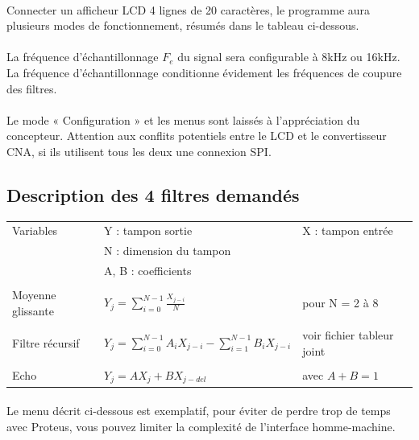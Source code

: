 \documentclass{article}
\begin{document}
    \paragraph{}
    Connecter un afficheur LCD 4 lignes de 20 caractères, le programme aura plusieurs modes de fonctionnement, résumés dans le tableau ci-dessous.

    \paragraph{}
    La fréquence d’échantillonnage $F_e$ du signal sera configurable à 8kHz ou 16kHz. La fréquence d’échantillonnage conditionne évidement les fréquences de coupure des filtres.

    \paragraph{}
    Le mode « Configuration » et les menus sont laissés à l’appréciation du concepteur. Attention aux conflits potentiels entre le LCD et le convertisseur CNA, si ils utilisent tous les deux une connexion SPI.

    \subsection{Description des 4 filtres demandés}

    \begin{tabular}{l l l}
        Variables           & Y : tampon sortie & X : tampon entrée \\
                            & N : dimension du tampon & \\
                            & A, B : coefficients & \\
                            & & \\
        Moyenne glissante   & $Y_j = \sum\limits_{i=0}^{N-1} \frac{X_{j-i}}{N}$ & pour N = 2 à 8 \\
                            & & \\
        Filtre récursif     & $Y_j = \sum\limits_{i=0}^{N-1} A_i X_{j-i} - \sum\limits_{i=1}^{N-1} B_i X_{j-i}$ & voir fichier tableur joint \\
                            & & \\
        Echo                &  $Y_j = A X_j + B X_{j-del}$ & avec $A + B = 1$ \\
    \end{tabular}

    \paragraph{}
    Le menu décrit ci-dessous est exemplatif, pour éviter de perdre trop de temps avec Proteus, vous pouvez limiter la complexité de l’interface homme-machine.
\end{document}

